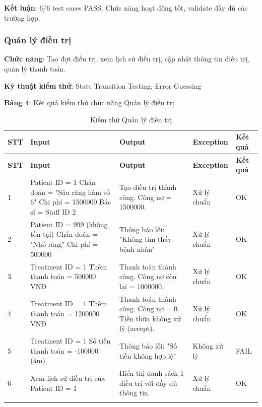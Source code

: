 \textbf{Kết luận}: 6/6 test cases PASS. Chức năng hoạt động tốt, validate đầy đủ các trường hợp.

\subsubsection{Quản lý điều trị}

\textbf{Chức năng}: Tạo đợt điều trị, xem lịch sử điều trị, cập nhật thông tin điều trị, quản lý thanh toán.

\textbf{Kỹ thuật kiểm thử}: State Transition Testing, Error Guessing

\textbf{Bảng 4}: Kết quả kiểm thử chức năng Quản lý điều trị

\begin{longtable}{|p{1cm}|p{5cm}|p{4cm}|p{3cm}|p{1.5cm}|}
\hline
\textbf{STT} & \textbf{Input} & \textbf{Output} & \textbf{Exception} & \textbf{Kết quả} \\
\hline
\endfirsthead

\hline
\textbf{STT} & \textbf{Input} & \textbf{Output} & \textbf{Exception} & \textbf{Kết quả} \\
\hline
\endhead

\hline
\endfoot

1 & Patient ID = 1 \newline Chẩn đoán = "Sâu răng hàm số 6" \newline Chi phí = 1500000 \newline Bác sĩ = Staff ID 2 & Tạo điều trị thành công. Công nợ = 1500000. & Xử lý chuẩn & OK \\
\hline

2 & Patient ID = 999 (không tồn tại) \newline Chẩn đoán = "Nhổ răng" \newline Chi phí = 500000 & Thông báo lỗi: "Không tìm thấy bệnh nhân" & Xử lý chuẩn & OK \\
\hline

3 & Treatment ID = 1 \newline Thêm thanh toán = 500000 VNĐ & Thanh toán thành công. Công nợ còn lại = 1000000. & Xử lý chuẩn & OK \\
\hline

4 & Treatment ID = 1 \newline Thêm thanh toán = 1200000 VNĐ & Thanh toán thành công. Công nợ = 0. Tiền thừa không xử lý (accept). & Xử lý chuẩn & OK \\
\hline

5 & Treatment ID = 1 \newline Số tiền thanh toán = -100000 (âm) & Thông báo lỗi: "Số tiền không hợp lệ" & Không xử lý & FAIL \\
\hline

6 & Xem lịch sử điều trị của Patient ID = 1 & Hiển thị danh sách 1 điều trị với đầy đủ thông tin. & Xử lý chuẩn & OK \\
\hline

\caption{Kiểm thử Quản lý điều trị}
\end{longtable}

